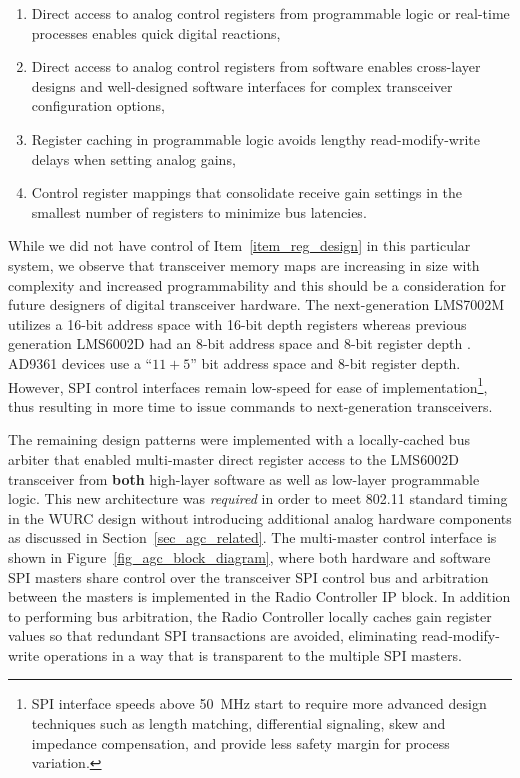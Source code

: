 \begin{enumerate}
\item Direct access to analog control registers from programmable logic or real-time processes enables quick digital reactions,
\item Direct access to analog control registers from software enables cross-layer designs and well-designed software interfaces for complex transceiver configuration options,
\item Register caching in programmable logic avoids lengthy read-modify-write delays when setting analog gains,
\item Control register mappings that consolidate receive gain settings in the smallest number of registers to minimize bus latencies. \label{item_reg_design}
\end{enumerate}

	While we did not have control of Item~\ref{item_reg_design} in this particular system, we observe that transceiver memory maps are increasing in size with complexity and increased programmability and this should be a consideration for future designers of digital transceiver hardware.
	The next-generation LMS7002M utilizes a 16-bit address space with 16-bit depth registers whereas previous generation LMS6002D had an 8-bit address space and 8-bit register depth \cite{lime2012lms6002d, lime2018lms7002M}.
	AD9361 devices use a ``$11+5$'' bit address space and 8-bit register depth.
	However, \ac{SPI} control interfaces remain low-speed for ease of implementation\footnote{\ac{SPI} interface speeds above 50~MHz start to require more advanced design techniques such as length matching, differential signaling, skew and impedance compensation, and provide less safety margin for process variation.}, thus resulting in more time to issue commands to next-generation transceivers.

	The remaining design patterns were implemented with a locally-cached bus arbiter that enabled multi-master direct register access to the LMS6002D transceiver from \textbf{both} high-layer software as well as low-layer programmable logic.
	This new architecture was \emph{required} in order to meet 802.11 standard timing in the \ac{WURC} design without introducing additional analog hardware components as discussed in Section~\ref{sec_agc_related}.
	The multi-master control interface is shown in Figure~\ref{fig_agc_block_diagram}, where both hardware and software \ac{SPI} masters share control over the transceiver \ac{SPI} control bus and arbitration between the masters is implemented in the Radio Controller IP block.
	In addition to performing bus arbitration, the Radio Controller locally caches gain register values so that redundant \ac{SPI} transactions are avoided, eliminating read-modify-write operations in a way that is transparent to the multiple \ac{SPI} masters.
	
